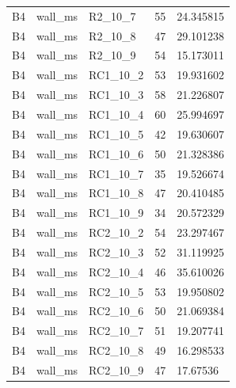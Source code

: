\begin{longtable}{lllll}
B4 & wall\_ms & R2\_10\_7 & 55 & 24.345815 \\
B4 & wall\_ms & R2\_10\_8 & 47 & 29.101238 \\
B4 & wall\_ms & R2\_10\_9 & 54 & 15.173011 \\
B4 & wall\_ms & RC1\_10\_2 & 53 & 19.931602 \\
B4 & wall\_ms & RC1\_10\_3 & 58 & 21.226807 \\
B4 & wall\_ms & RC1\_10\_4 & 60 & 25.994697 \\
B4 & wall\_ms & RC1\_10\_5 & 42 & 19.630607 \\
B4 & wall\_ms & RC1\_10\_6 & 50 & 21.328386 \\
B4 & wall\_ms & RC1\_10\_7 & 35 & 19.526674 \\
B4 & wall\_ms & RC1\_10\_8 & 47 & 20.410485 \\
B4 & wall\_ms & RC1\_10\_9 & 34 & 20.572329 \\
B4 & wall\_ms & RC2\_10\_2 & 54 & 23.297467 \\
B4 & wall\_ms & RC2\_10\_3 & 52 & 31.119925 \\
B4 & wall\_ms & RC2\_10\_4 & 46 & 35.610026 \\
B4 & wall\_ms & RC2\_10\_5 & 53 & 19.950802 \\
B4 & wall\_ms & RC2\_10\_6 & 50 & 21.069384 \\
B4 & wall\_ms & RC2\_10\_7 & 51 & 19.207741 \\
B4 & wall\_ms & RC2\_10\_8 & 49 & 16.298533 \\
B4 & wall\_ms & RC2\_10\_9 & 47 & 17.67536 \\
\hline
\end{longtable}
